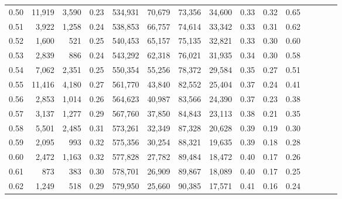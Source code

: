 \begin{tabular}{rrrcrrrrrrrrrrr}
0.50 &  11,919 &  3,590 &                                       0.23 &  534,931 &   70,679 &   73,356 &   34,600 &  0.33 &  0.32 &                         0.65 \\
0.51 &   3,922 &  1,258 &                                       0.24 &  538,853 &   66,757 &   74,614 &   33,342 &  0.33 &  0.31 &                         0.62 \\
0.52 &   1,600 &    521 &                                       0.25 &  540,453 &   65,157 &   75,135 &   32,821 &  0.33 &  0.30 &                         0.60 \\
0.53 &   2,839 &    886 &                                       0.24 &  543,292 &   62,318 &   76,021 &   31,935 &  0.34 &  0.30 &                         0.58 \\
0.54 &   7,062 &  2,351 &                                       0.25 &  550,354 &   55,256 &   78,372 &   29,584 &  0.35 &  0.27 &                         0.51 \\
0.55 &  11,416 &  4,180 &                                       0.27 &  561,770 &   43,840 &   82,552 &   25,404 &  0.37 &  0.24 &                         0.41 \\
0.56 &   2,853 &  1,014 &                                       0.26 &  564,623 &   40,987 &   83,566 &   24,390 &  0.37 &  0.23 &                         0.38 \\
0.57 &   3,137 &  1,277 &                                       0.29 &  567,760 &   37,850 &   84,843 &   23,113 &  0.38 &  0.21 &                         0.35 \\
0.58 &   5,501 &  2,485 &                                       0.31 &  573,261 &   32,349 &   87,328 &   20,628 &  0.39 &  0.19 &                         0.30 \\
0.59 &   2,095 &    993 &                                       0.32 &  575,356 &   30,254 &   88,321 &   19,635 &  0.39 &  0.18 &                         0.28 \\
0.60 &   2,472 &  1,163 &                                       0.32 &  577,828 &   27,782 &   89,484 &   18,472 &  0.40 &  0.17 &                         0.26 \\
0.61 &     873 &    383 &                                       0.30 &  578,701 &   26,909 &   89,867 &   18,089 &  0.40 &  0.17 &                         0.25 \\
0.62 &   1,249 &    518 &                                       0.29 &  579,950 &   25,660 &   90,385 &   17,571 &  0.41 &  0.16 &                         0.24 \\

\end{tabular}
